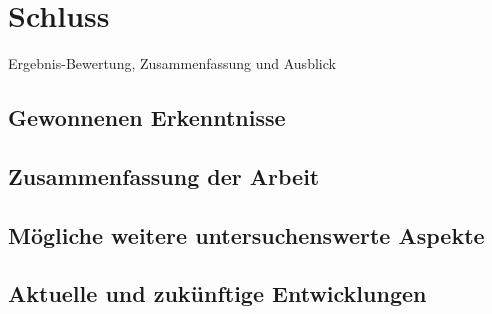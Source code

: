 \chapter{Schluss}
\label{sec:schluss}
Ergebnis-Bewertung, Zusammenfassung und Ausblick

\section{Gewonnenen Erkenntnisse}

\section{Zusammenfassung der Arbeit}

\section{Mögliche weitere untersuchenswerte Aspekte}

\section{Aktuelle und zukünftige Entwicklungen}

